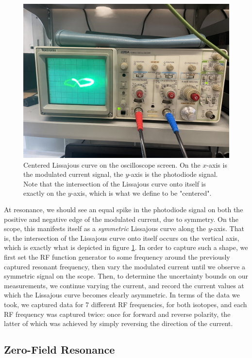 \documentclass[10pt]{article}
\begin{document}
	\begin{figure}
		\centering
		\includegraphics[scale=0.3]{images/lissajous.jpg}
		\caption{Centered Lissajous curve on the oscilloscope screen. On the \( x
			\)-axis is the modulated current signal, the \( y \)-axis is the
		photodiode signal. Note that the intersection of the Lissajous curve onto
	itself is exactly on the \( y \)-axis, which is what we define to be "centered".}
		\label{lissajous}
	\end{figure}
	
	At resonance, we should see an equal spike in the photodiode signal on both the
	positive and negative edge of the modulated current, due to symmetry. On the
	scope, this manifests itself as a \textit{symmetric} Lissajous curve along the \(
	y\)-axis. That is, the intersection of the Lissajous curve onto itself occurs on
	the vertical axis, which is exactly what is depicted in figure \ref{lissajous}.
	In order to capture such a shape, we first set the RF function generator to some
	frequency around the previously captured resonant frequency, then vary the
	modulated current until we observe a symmetric signal on the scope. Then, to
	determine the uncertainty bounds on our measurements, we continue varying the
	current, and record the current values at which the Lissajous curve becomes
	clearly asymmetric. In terms of the data we took, we captured data for 7 
	different RF frequencies,
	for both isotopes, and each RF frequency was captured twice: once for forward and
	reverse polarity, the latter of which was achieved by simply reversing the
	direction of the current. 

	\subsection{Zero-Field Resonance}
\end{document}
